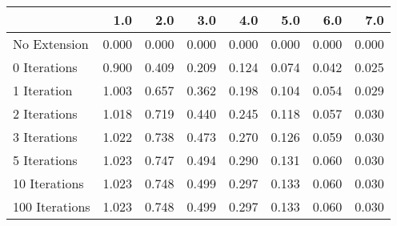 \begin{tabular}{lrrrrrrr}
\toprule
{} &   1.0 &   2.0 &   3.0 &   4.0 &   5.0 &   6.0 &   7.0 \\
\midrule
No Extension   & 0.000 & 0.000 & 0.000 & 0.000 & 0.000 & 0.000 & 0.000 \\
0 Iterations   & 0.900 & 0.409 & 0.209 & 0.124 & 0.074 & 0.042 & 0.025 \\
1 Iteration    & 1.003 & 0.657 & 0.362 & 0.198 & 0.104 & 0.054 & 0.029 \\
2 Iterations   & 1.018 & 0.719 & 0.440 & 0.245 & 0.118 & 0.057 & 0.030 \\
3 Iterations   & 1.022 & 0.738 & 0.473 & 0.270 & 0.126 & 0.059 & 0.030 \\
5 Iterations   & 1.023 & 0.747 & 0.494 & 0.290 & 0.131 & 0.060 & 0.030 \\
10 Iterations  & 1.023 & 0.748 & 0.499 & 0.297 & 0.133 & 0.060 & 0.030 \\
100 Iterations & 1.023 & 0.748 & 0.499 & 0.297 & 0.133 & 0.060 & 0.030 \\
\bottomrule
\end{tabular}
